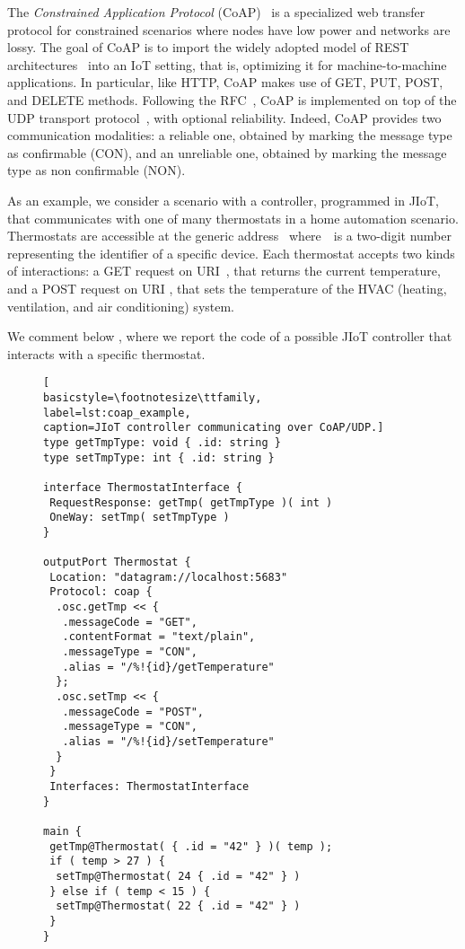 The \textit{Constrained Application Protocol}
(CoAP)~\cite{coap,doi:10.17487/RFC7252} is a specialized web transfer protocol
for constrained scenarios where nodes have low power and networks are lossy. The
goal of CoAP is to import the widely adopted model of REST
architectures~\cite{fielding00} into an IoT setting, that is, optimizing it for
machine-to-machine applications. In particular, like HTTP,
CoAP makes use of GET, PUT,
POST, and DELETE methods.
%
Following the RFC~\cite{doi:10.17487/RFC7252}, CoAP is implemented on top of the
UDP transport protocol~\cite{UDP}, with optional reliability. Indeed, CoAP
provides two communication modalities: a reliable one, obtained by marking the
message type as confirmable (CON), and an unreliable one, obtained by marking the
message type as non confirmable (NON).

As an example, we consider a scenario with a controller, programmed in 
JIoT, that communicates with one of many thermostats 
in a home automation scenario.
Thermostats are accessible at the generic address~ 
where~~is a two-digit number representing the identifier 
of a specific device. 
Each thermostat accepts two kinds of interactions: a GET request on 
URI~,
that returns the current temperature, and a POST
request on URI , 
that sets the temperature of the HVAC (heating, ventilation, and air
conditioning) system.

We comment below , where we report the code of a
possible JIoT controller that interacts with a specific thermostat.

\begin{figure}[t]
\begin{lstlisting}[
basicstyle=\footnotesize\ttfamily,
label=lst:coap_example,
caption=JIoT controller communicating over CoAP/UDP.]
type getTmpType: void { .id: string }
type setTmpType: int { .id: string }

interface ThermostatInterface {
 RequestResponse: getTmp( getTmpType )( int )
 OneWay: setTmp( setTmpType )
}

outputPort Thermostat {
 Location: "datagram://localhost:5683"
 Protocol: coap {
  .osc.getTmp << {
   .messageCode = "GET",
   .contentFormat = "text/plain",
   .messageType = "CON",
   .alias = "/%!{id}/getTemperature"
  };
  .osc.setTmp << {
   .messageCode = "POST",
   .messageType = "CON",
   .alias = "/%!{id}/setTemperature"  
  }
 }
 Interfaces: ThermostatInterface
}

main {
 getTmp@Thermostat( { .id = "42" } )( temp );
 if ( temp > 27 ) {
  setTmp@Thermostat( 24 { .id = "42" } )
 } else if ( temp < 15 ) {
  setTmp@Thermostat( 22 { .id = "42" } )
 }
}
\end{lstlisting}
\end{figure}

